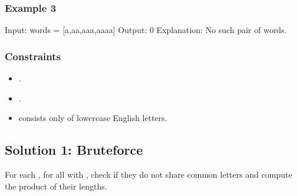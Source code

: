 \documentclass[letterpaper,12pt,english]{book}
\begin{document}
\subsubsection{Example 3}
\label{\detokenize{Mathematics/09_MTH_318_Maximum_Product_of_Word_Lengths:example-3}}
\begin{sphinxVerbatim}[commandchars=\\\{\}]
Input: words = [\PYGZdq{}a\PYGZdq{},\PYGZdq{}aa\PYGZdq{},\PYGZdq{}aaa\PYGZdq{},\PYGZdq{}aaaa\PYGZdq{}]
Output: 0
Explanation: No such pair of words.
\end{sphinxVerbatim}


\subsubsection{Constraints}
\label{\detokenize{Mathematics/09_MTH_318_Maximum_Product_of_Word_Lengths:constraints}}\begin{itemize}
\item {} 
\sphinxAtStartPar
{}.

\item {} 
\sphinxAtStartPar
{}.

\item {} 
\sphinxAtStartPar
{} consists only of lowercase English letters.

\end{itemize}


\subsection{Solution 1: Bruteforce}
\label{\detokenize{Mathematics/09_MTH_318_Maximum_Product_of_Word_Lengths:solution-1-bruteforce}}
\sphinxAtStartPar
For each , for all  with , check if they do not share common letters and compute the product of their lengths.
\end{document}
